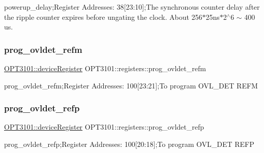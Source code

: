 powerup\+\_\+delay;Register Addresses\+: 38\mbox{[}23\+:10\mbox{]};The synchronous counter delay after the ripple counter expires before ungating the clock. About 256$\ast$25ns$\ast$2$^\wedge$6 $\sim$ 400 us. 

\mbox{\label{class_o_p_t3101_1_1registers_a4ae7fee3fc50dfe0b8db37304a02adf4}} 
\subsubsection{\texorpdfstring{prog\+\_\+ovldet\+\_\+refm}{prog\_ovldet\_refm}}
{\footnotesize\ttfamily \mbox{\hyperlink{class_o_p_t3101_1_1device_register}{O\+P\+T3101\+::device\+Register}} O\+P\+T3101\+::registers\+::prog\+\_\+ovldet\+\_\+refm}



prog\+\_\+ovldet\+\_\+refm;Register Addresses\+: 100\mbox{[}23\+:21\mbox{]};To program O\+V\+L\+\_\+\+D\+ET R\+E\+FM 

\mbox{\label{class_o_p_t3101_1_1registers_a5a2861d0fdb55bb7b6fb2460e1e043df}} 
\subsubsection{\texorpdfstring{prog\+\_\+ovldet\+\_\+refp}{prog\_ovldet\_refp}}
{\footnotesize\ttfamily \mbox{\hyperlink{class_o_p_t3101_1_1device_register}{O\+P\+T3101\+::device\+Register}} O\+P\+T3101\+::registers\+::prog\+\_\+ovldet\+\_\+refp}



prog\+\_\+ovldet\+\_\+refp;Register Addresses\+: 100\mbox{[}20\+:18\mbox{]};To program O\+V\+L\+\_\+\+D\+ET R\+E\+FP 

\mbox{\label{class_o_p_t3101_1_1registers_ad94d98dfb26313a9d32c5c2c0c673693}} 
